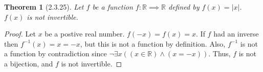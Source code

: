 \documentclass[a4paper, 12pt]{article}
\theoremstyle{plain}
\newtheorem*{theorem*}{Theorem}
\begin{document}
	
	\begin{theorem*}[2.3.25]
		Let $f$ be a function $f: \mathbb{R} \implies \mathbb{R}$ defined by $f(x) = |x|$. $f(x)$ is not invertible.
	\end{theorem*}
	
	\begin{proof}
		Let $x$ be a postive real number. $f(-x) = f(x) = x$. If $f$ had an inverse then $f^{-1}(x) = x = -x$, but this is not a function by definition. Also, $f^{-1}$ is not a function by contradiction since $\lnot \exists x ((x \in \mathbb{R}) \land (x = -x))$. Thus, $f$ is not a bijection, and $f$ is not invertible.
	\end{proof}
\end{document}
